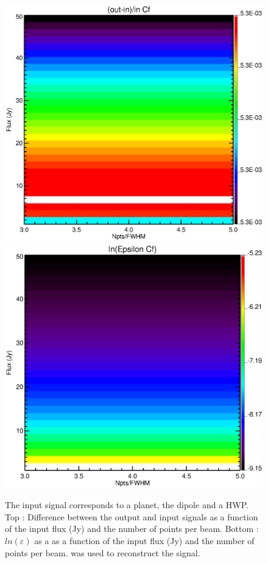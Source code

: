 \begin{figure}[h]
\center
	\includegraphics[scale=0.2]{Figures/diff_cf_planet_hwp_dipole.eps}
	\includegraphics[scale=0.2]{Figures/epsilon_cf_planet_hwp_dipole.eps}
	\caption{The input signal corresponds to a planet, the dipole and a HWP. Top : Difference between the output and input signals as a function of the input flux (Jy) and the number of points per beam. Bottom : $ln(\varepsilon)$ as a as a function of the input flux (Jy) and the number of points per beam. \cf was used to reconstruct the signal.}
	\label{fig:epsilon-cf-planet-hwp-dipole}
\end{figure}

